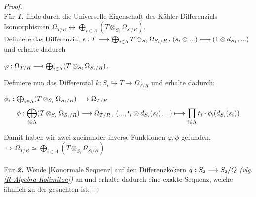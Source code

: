 \documentclass[10pt,a4paper]{report}
\newcommand{\functionfront}[3]{\nolinebreak{#1:#2 \longrightarrow #3}}
\newcommand{\function}[5]{\nolinebreak{#1:#2 \longrightarrow #3 \, , \, #4 \longmapsto #5}}
\newcommand{\divR}[2]{\Omega_{#1/#2}}
\newcommand{\divf}[1]{d_{#1}}
\newcommand{\Tensor}[3]{#1 \otimes_{#2} #3}
\newcommand{\tensor}[3]{#1 \otimes #3}
\begin{document}
\begin{proof}\ \\
Für \textit{\textbf{1.}} finde durch die Universelle Eigenschaft des Kähler-Differenzials Isomorphismen $ \divR{T}{R} \longleftrightarrow \bigoplus_{i \in \Lambda} ( \Tensor{T}{S_i}{\divR{S_i}{R}} )$.\\
Definiere das Differenzial $\function{e}{T}{\bigoplus_{i \in \Lambda} \Tensor{T}{S_i}{\divR{S_i}{R}}}{(\tensor{s_i}{R}{...})}{(\tensor{1}{S_i}{\divf{S_1},...)}}$ und erhalte dadurch
\begin{center}
$\functionfront{\varphi}{\divR{T}{R}}{\bigoplus_{i\in \Lambda} ( \Tensor{T}{S_i}{\divR{S_i}{R}} )}$.
\end{center}
Definiere nun das Differenzial $k: S_i \hookrightarrow T \longrightarrow \divR{T}{R}$ und erhalte dadurch:
\begin{center}
$\functionfront{\phi_i}{\bigoplus_{i\in \Lambda} ( \Tensor{T}{S_i}{\divR{S_i}{R}} )}{\divR{T}{R}}$\\
\begin{gather*}
\function{\phi}{\bigoplus_{i\in \Lambda} ( \Tensor{T}{S_i}{\divR{S_i}{R}})}{\divR{T}{R}}{(...,\tensor{t_i}{S_i}{\divf{S_i}(s_i)},...)}{\prod_{i\in \Lambda} t_i \cdot \phi_i(\divf{S_i}(s_i))}
\end{gather*}
\end{center}
Damit haben wir zwei zueinander inverse Funktionen $\varphi ,\phi$ gefunden.\\
$\Rightarrow \divR{T}{R} \simeq \bigoplus_{i\in \Lambda} ( \Tensor{T}{S_i}{\divR{S_i}{R}} )$\\
\ \\
Für \textit{\textbf{2.}} Wende \cref{Konormale Sequenz} auf den Differenzkokern $\functionfront{q}{S_2}{S_2/Q}$ \textit{(vlg. \cref{R-Algebra-Kolimiten})} an und erhalte dadurch eine exakte Sequenz, welche ähnlich zu der gesuchten ist:

\end{proof}
\end{document}
